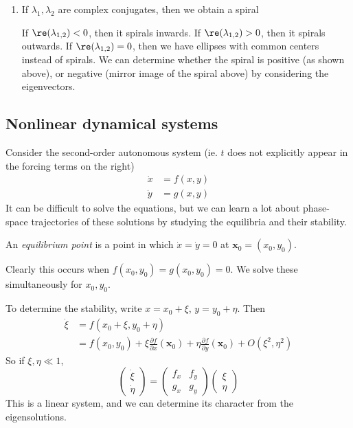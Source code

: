 \documentclass[a4paper]{article}
\begin{document}
\begin{enumerate}
  \item If $\lambda_1, \lambda_2$ are complex conjugates, then we obtain a spiral
    \begin{center}
    \end{center}
    If $\re (\lambda_{1, 2}) < 0$, then it spirals inwards. If $\re (\lambda_{1, 2}) > 0$, then it spirals outwards. If $\re (\lambda_{1, 2}) = 0$, then we have ellipses with common centers instead of spirals. We can determine whether the spiral is positive (as shown above), or negative (mirror image of the spiral above) by considering the eigenvectors.
\end{enumerate}

\subsection{Nonlinear dynamical systems}
Consider the second-order autonomous system (ie. $t$ does not explicitly appear in the forcing terms on the right)
\begin{align*}
  \dot x &= f(x, y)\\
  \dot y &= g(x, y)
\end{align*}
It can be difficult to solve the equations, but we can learn a lot about phase-space trajectories of these solutions by studying the equilibria and their stability.

\begin{defi}
  An \emph{equilibrium point} is a point in which $\dot x = \dot y = 0$ at $\mathbf{x}_0 = (x_0, y_0)$.
\end{defi}

Clearly this occurs when $f(x_0, y_0) = g(x_0, y_0) = 0$. We solve these simultaneously for $x_0, y_0$.

To determine the stability, write $x = x_0 + \xi$, $y = y_0 + \eta$. Then
\begin{align*}
  \dot \xi &= f(x_0 + \xi, y_0 + \eta)\\
  &= f(x_0, y_0)+ \xi \frac{\partial f}{\partial x}(\mathbf{x}_0) + \eta \frac{\partial f}{\partial y}(\mathbf{x}_0) + O(\xi^2, \eta^2)
\end{align*}
So if $\xi, \eta \ll 1$,
\[
  \begin{pmatrix}
    \dot \xi\\\dot \eta
  \end{pmatrix} =
  \begin{pmatrix}
    f_x & f_y\\
    g_x & g_y
  \end{pmatrix}
  \begin{pmatrix}
    \xi\\\eta
  \end{pmatrix}
\]
This is a linear system, and we can determine its character from the eigensolutions.
\end{document}
